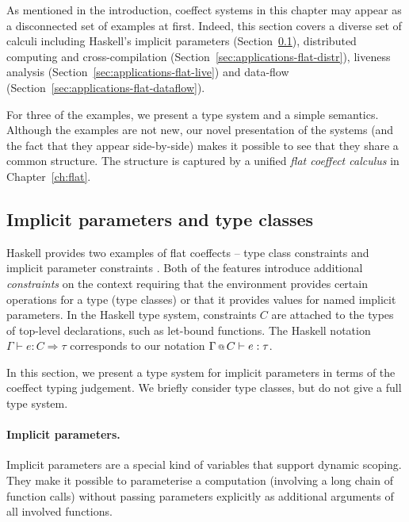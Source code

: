 As mentioned in the introduction, coeffect systems in this chapter may appear as a disconnected
set of examples at first. Indeed, this section covers a diverse set of calculi including
Haskell's implicit parameters (Section~\ref{sec:applications-flat-impl}), distributed computing and 
cross-compilation (Section~\ref{sec:applications-flat-distr}), liveness analysis 
(Section~\ref{sec:applications-flat-live}) and data-flow (Section~\ref{sec:applications-flat-dataflow}).

For three of the examples, we present a type system and a simple semantics. Although the examples 
are not new, our novel presentation of the systems (and the fact that they appear side-by-side)
makes it possible to see that they share a common structure. The structure is captured by
a unified \emph{flat coeffect calculus} in Chapter~\ref{ch:flat}.


\subsection{Implicit parameters and type classes} 
\label{sec:applications-flat-impl}

Haskell provides two examples of flat coeffects -- type class constraints and implicit parameter 
constraints \cite{app-type-classes,app-implicit-parameters}. Both of the features introduce additional 
\emph{constraints} on the context requiring that the environment provides certain operations for
a type (type classes) or that it provides values for named implicit parameters.
In the Haskell type system, constraints $C$ are attached to the types of top-level declarations,
such as let-bound functions. The Haskell notation $\Gamma \vdash e : C \Rightarrow \tau$ 
corresponds to our notation $\Gamma \,\text{\scriptsize @}\, {{\text{$C$}}} \vdash e : \tau$. 

In this section, we present a type system for implicit parameters in terms of the coeffect typing
judgement. We briefly consider type classes, but do not give a full type system.

\paragraph{Implicit parameters.}
Implicit parameters are a special kind of variables that support dynamic scoping.
They make it possible to parameterise a computation (involving a long chain of function calls)
without passing parameters explicitly as additional arguments of all involved functions. 

